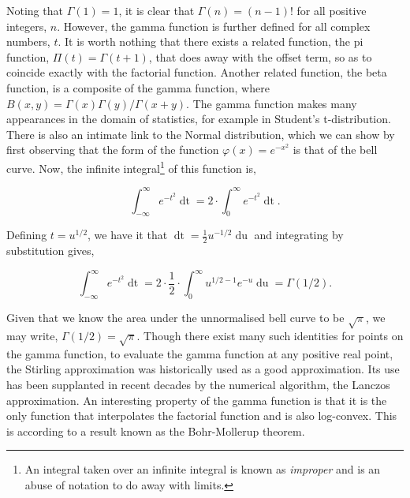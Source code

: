 \documentclass[11pt]{amsart}
\begin{document}
Noting that $\Gamma(1) = 1$, it is clear that $\Gamma(n) = (n - 1)!$ for all positive integers, $n$. However, the gamma function is further defined for all complex numbers, $t$. It is worth nothing that there exists a related function, the pi function, $\Pi(t) = \Gamma(t + 1)$, that does away with the offset term, so as to coincide exactly with the factorial function. Another related function, the beta function, is a composite of the gamma function, where $B(x, y) = \Gamma(x)\Gamma(y)/\Gamma(x+y)$. The gamma function makes many appearances in the domain of statistics, for example in Student's t-distribution. There is also an intimate link to the Normal distribution, which we can show by first observing that the form of the function $\varphi(x) = e^{-x^2}$ is that of the bell curve. Now, the infinite integral\footnote{An integral taken over an infinite integral is known as \emph{improper} and is an abuse of notation to do away with limits.} of this function is,

$$\int_{-\infty}^{\infty} e^{-t^2} \mathop{dt} = 2\cdot\int_{0}^{\infty} e^{-t^2} \mathop{dt}.$$

Defining $t = u^{1/2}$, we have it that $\mathop{dt} = \frac{1}{2}u^{-1/2}\mathop{du}$ and integrating by substitution gives,

$$\int_{-\infty}^{\infty} e^{-t^2} \mathop{dt} = 2\cdot\frac{1}{2}\cdot\int_{0}^{\infty}u^{1/2 - 1} e^{-u}\mathop{du} = \Gamma(1/2).$$

Given that we know the area under the unnormalised bell curve to be $\sqrt{\pi}$, we may write, $\Gamma(1/2) = \sqrt{\pi}$. Though there exist many such identities for points on the gamma function, to evaluate the gamma function at any positive real point, the Stirling approximation was historically used as a good approximation. Its use has been supplanted in recent decades by the numerical algorithm, the Lanczos approximation. An interesting property of the gamma function is that it is the only function that interpolates the factorial function and is also log-convex. This is according to a result known as the Bohr-Mollerup theorem.
\end{document}
